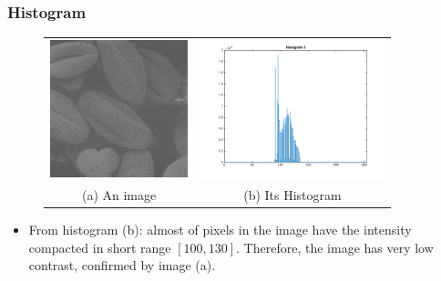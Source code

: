 \documentclass[english,11pt,table,handout]{beamer}
\begin{document}
\begin{frame}[fragile]
\frametitle{Histogram}
\begin{figure}[!h]
	\begin{table}
		\begin{tabular}{cc}
			\includegraphics[height=4cm]{./images/bean3.jpg} &
			\includegraphics[height=4cm]{./images/histogram3.png} \\
			(a) An image & (b) Its Histogram
		\end{tabular}
	\end{table}
\end{figure}
\begin{itemize}
	\item From histogram (b): almost of pixels in the image have the intensity compacted in short range $[100, 130]$. Therefore, the image has very low contrast, confirmed by image (a).
\end{itemize}
\end{frame}
\end{document}
